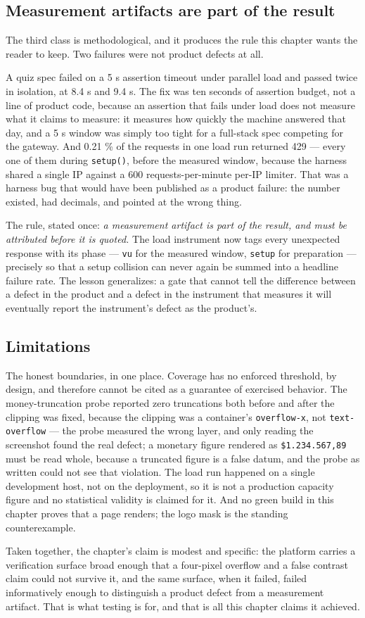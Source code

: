 \subsection{Measurement artifacts are part of the result}

The third class is methodological, and it produces the rule this chapter wants the reader to keep.
Two failures were not product defects at all.

A quiz spec failed on a 5 s assertion timeout under parallel load and passed twice in isolation, at
8.4 s and 9.4 s. The fix was ten seconds of assertion budget, not a line of product code, because
an assertion that fails under load does not measure what it claims to measure: it measures how
quickly the machine answered that day, and a 5 s window was simply too tight for a full-stack spec
competing for the gateway. And 0.21 \% of the requests in one load run returned 429 — every one of
them during \verb|setup()|, before the measured window, because the harness shared a single IP
against a 600 requests-per-minute per-IP limiter. That was a harness bug that would have been
published as a product failure: the number existed, had decimals, and pointed at the wrong thing.

The rule, stated once: \emph{a measurement artifact is part of the result, and must be attributed
before it is quoted.} The load instrument now tags every unexpected response with its phase —
\verb|vu| for the measured window, \verb|setup| for preparation — precisely so that a setup
collision can never again be summed into a headline failure rate. The lesson generalizes: a gate
that cannot tell the difference between a defect in the product and a defect in the instrument that
measures it will eventually report the instrument's defect as the product's.

\subsection{Limitations}

The honest boundaries, in one place. Coverage has no enforced threshold, by design, and therefore
cannot be cited as a guarantee of exercised behavior. The money-truncation probe reported zero
truncations both before and after the clipping was fixed, because the clipping was a container's
\verb|overflow-x|, not \verb|text-overflow| — the probe measured the wrong layer, and only reading
the screenshot found the real defect; a monetary figure rendered as \verb|$1.234.567,89| must be
read whole, because a truncated figure is a false datum, and the probe as written could not see that
violation. The load run happened on a single development host, not on the deployment, so it is not a
production capacity figure and no statistical validity is claimed for it. And no green build in
this chapter proves that a page renders; the logo mask is the standing counterexample.

Taken together, the chapter's claim is modest and specific: the platform carries a verification
surface broad enough that a four-pixel overflow and a false contrast claim could not survive it,
and the same surface, when it failed, failed informatively enough to distinguish a product defect
from a measurement artifact. That is what testing is for, and that is all this chapter claims it
achieved.
